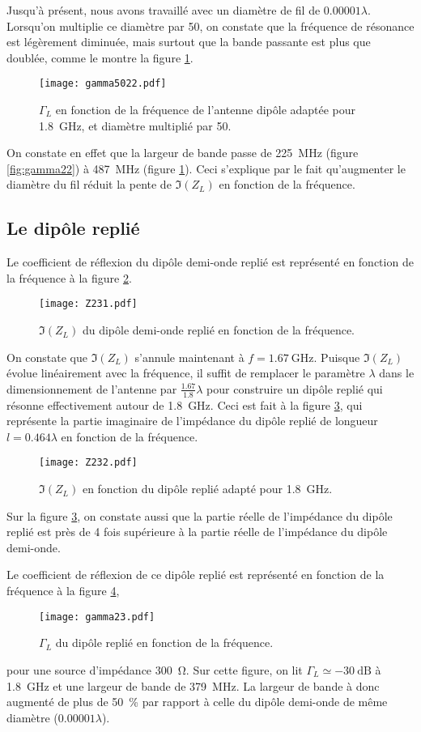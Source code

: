 Jusqu'à présent, nous avons travaillé avec un diamètre de fil de $0.00001 \lambda$. Lorsqu'on multiplie ce diamètre par 50, on constate que la fréquence de résonance est légèrement diminuée, mais surtout que la bande passante est plus que doublée, comme le montre la figure \ref{fig:gamma5022}.
\begin{figure}[htbp]
  \centering
  \texttt{[image: gamma5022.pdf]}
  \caption{$\Gamma_L$  en fonction de la fréquence de l'antenne dipôle adaptée pour \SI{1.8}{\giga\hertz}, et diamètre multiplié par 50.\label{fig:gamma5022}}
\end{figure}
On constate en effet que la largeur de bande passe de \SI{225}{\mega\hertz} (figure \ref{fig:gamma22}) à \SI{487}{\mega\hertz} (figure \ref{fig:gamma5022}). Ceci s'explique par le fait qu'augmenter le diamètre du fil réduit la pente de $\Im(Z_L)$ en fonction de la fréquence.

\subsection{Le dipôle replié}
Le coefficient de réflexion du dipôle demi-onde replié est représenté en fonction de la fréquence à la figure \ref{fig:Z231}.

\begin{figure}[htbp]
  \centering
  \texttt{[image: Z231.pdf]}
  \caption{$\Im(Z_L)$ du dipôle demi-onde replié en fonction de la fréquence.\label{fig:Z231}}
\end{figure}
On constate que $\Im(Z_L)$ s'annule maintenant à $f = \SI{1.67}{\giga\hertz}$. Puisque $\Im(Z_L)$ évolue linéairement avec la fréquence, il suffit de remplacer le paramètre $\lambda$ dans le dimensionnement de l'antenne par $\frac{1.67}{1.8}\lambda$ pour construire un dipôle replié qui résonne effectivement autour de \SI{1.8}{\giga\hertz}. Ceci est fait à la figure \ref{fig:Z232}, qui représente la partie imaginaire de l'impédance du dipôle replié de longueur $l = 0.464 \lambda$ en fonction de la fréquence.
\begin{figure}[htbp]
  \centering
  \texttt{[image: Z232.pdf]}
  \caption{$\Im(Z_L)$ en fonction du dipôle replié adapté pour \SI{1.8}{\giga\hertz}.\label{fig:Z232}}
\end{figure}
Sur la figure \ref{fig:Z232}, on constate aussi que la partie réelle de l'impédance du dipôle replié est près de 4 fois supérieure à la partie réelle de l'impédance du dipôle demi-onde.

Le coefficient de réflexion de ce dipôle replié est représenté en fonction de la fréquence à la figure \ref{fig:gamma23},
\begin{figure}[htbp]
  \centering
  \texttt{[image: gamma23.pdf]}
  \caption{$\Gamma_L$ du dipôle replié en fonction de la fréquence.\label{fig:gamma23}}
\end{figure}
pour une source d'impédance \SI{300}{\ohm}. Sur cette figure, on lit $\Gamma_L \simeq \SI{-30}{\deci\bel}$ à \SI{1.8}{\giga\hertz} et une largeur de bande de \SI{379}{\mega\hertz}. La largeur de bande à donc augmenté de plus de \SI{50}{\percent} par rapport à celle du dipôle demi-onde de même diamètre ($0.00001\lambda$).

